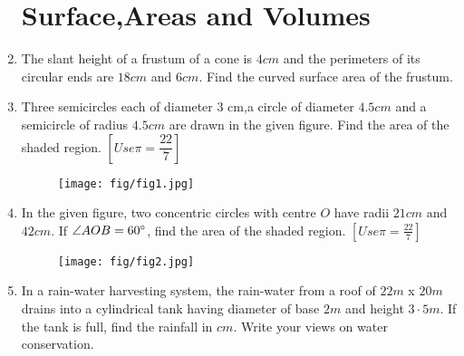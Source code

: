 \documentclass{article}
\providecommand{\sbrak}[1]{\ensuremath{\left[#1\right]}}
\begin{document}
\begin{enumerate}
																																																								    \section{Surface,Areas and Volumes}

																																																								            \item The slant height of a frustum of a cone is $4 cm$ and the perimeters of its circular ends are $18 cm$ and $6 cm$. Find the curved surface area of the frustum.
																																																										            
																																																										        \item Three semicircles each of diameter $3$ cm,a circle of diameter $4.5 cm$ and a semicircle of radius $4.5 cm$ are drawn in the given figure. Find the area of the shaded region. 
																																																												    \hfill $\sbrak {Use \pi = \dfrac{22}{7}}$
																																																												        \begin{figure}[h]
																																																														        \centering
																																																															        \texttt{[image: fig/fig1.jpg]}
																																																																    \end{figure}

																																																																        \item In the given figure, two concentric circles with centre $O$ have radii $21 cm$ and $42 cm$. If $\angle AOB = 60\degree$, find the area of the shaded region.
																																																																		    \hfill $\sbrak{Use \pi = \frac{22}{7}}$
																																																																		        \begin{figure}[h]
																																																																				        \centering
																																																																					        \texttt{[image: fig/fig2.jpg]}
																																																																						    \end{figure}

																																																																						    \newpage 

																																																																						        \item In a rain-water harvesting system, the rain-water from a roof of $22 m$ x $20m$ drains into a cylindrical tank having diameter of base $2 m$ and height $3·5 m$. If the tank is full, find the rainfall in $cm$. Write your views on water conservation.
																																																																								     

\end{enumerate}
\end{document}
